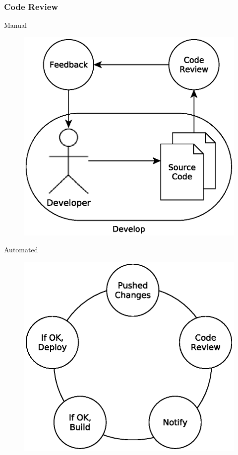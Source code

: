 \documentclass[10pt,xcolor=pdflatex]{beamer}
\begin{document}
\begin{frame}\frametitle{Code Review}
    \begin{multicols}{2}
        \centering \large Manual\\[1em]
        \begin{figure}[H]
            \centering
            \includegraphics[scale=0.4]{eps/code_review_1.eps}
        \end{figure}
        \centering \large Automated
        \begin{figure}[H]
            \centering
            \includegraphics[scale=0.4]{eps/code_review_2.eps}
            \\[1em]
        \end{figure}
    \end{multicols}
\end{frame}
\end{document}
